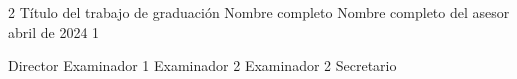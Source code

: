 \documentclass[letterpaper,12pt]{thesisECFM}
\begin{document}
	
	\datosThesis%
	{2}%
	{Título del trabajo de graduación}%
	{Nombre completo}%
	{Nombre completo del asesor}%
	{abril de 2024}		%
	{1}							%
	
	\examenPrivado%
	{Director}%
	{Examinador 1}%
	{Examinador 2}%
	{Examinador 2}%
	{Secretario }%
	{\onehalfspacing	%
		
		
		
		
		\par}
	
	\frontmatter    %
	
	{\onehalfspacing	%
		
		\tableofcontents    %
		
		
		
		
		
		\mainmatter     %
		
		
		
		
		{\backmatter     %
			
			
			\renewcommand{\bibname}{BIBLIOGRAF\'IA}
			\nocite{*}			%
			
			
		}
		
		
		
		\par}               %
	
\end{document}
